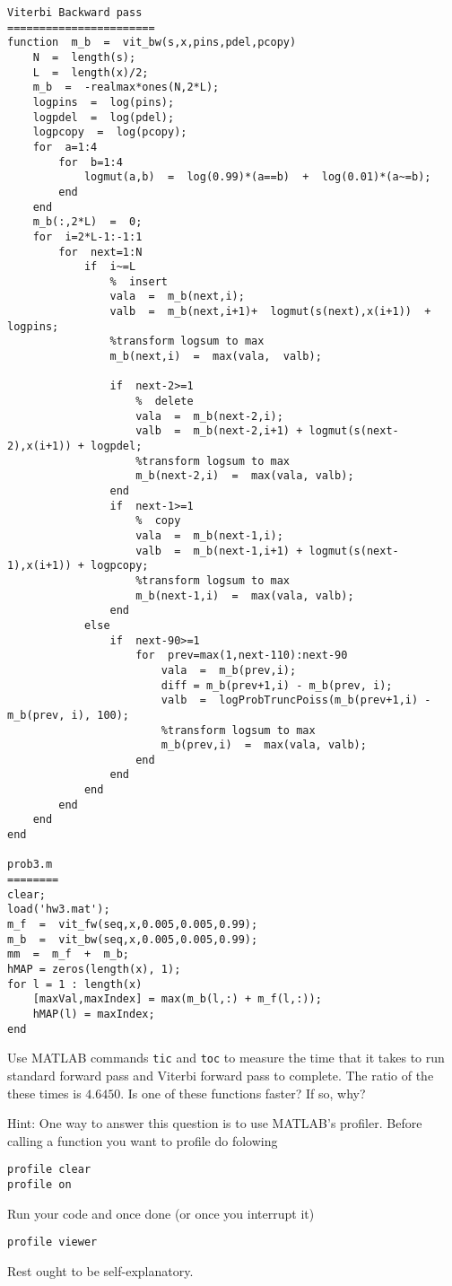 \documentclass{article}
\begin{document}
\begin{verbatim}
Viterbi Backward pass
=======================
function  m_b  =  vit_bw(s,x,pins,pdel,pcopy)
    N  =  length(s);
    L  =  length(x)/2;
    m_b  =  -realmax*ones(N,2*L);
    logpins  =  log(pins);
    logpdel  =  log(pdel);
    logpcopy  =  log(pcopy);
    for  a=1:4
        for  b=1:4
            logmut(a,b)  =  log(0.99)*(a==b)  +  log(0.01)*(a~=b);
        end
    end
    m_b(:,2*L)  =  0;
    for  i=2*L-1:-1:1    
        for  next=1:N
            if  i~=L
                %  insert
                vala  =  m_b(next,i);
                valb  =  m_b(next,i+1)+  logmut(s(next),x(i+1))  +  logpins;
                %transform logsum to max
                m_b(next,i)  =  max(vala,  valb);

                if  next-2>=1
                    %  delete
                    vala  =  m_b(next-2,i);
                    valb  =  m_b(next-2,i+1) + logmut(s(next-2),x(i+1)) + logpdel;
                    %transform logsum to max
                    m_b(next-2,i)  =  max(vala, valb);
                end
                if  next-1>=1
                    %  copy
                    vala  =  m_b(next-1,i);
                    valb  =  m_b(next-1,i+1) + logmut(s(next-1),x(i+1)) + logpcopy;
                    %transform logsum to max
                    m_b(next-1,i)  =  max(vala, valb);
                end
            else
                if  next-90>=1
                    for  prev=max(1,next-110):next-90
                        vala  =  m_b(prev,i);
                        diff = m_b(prev+1,i) - m_b(prev, i);
                        valb  =  logProbTruncPoiss(m_b(prev+1,i) - m_b(prev, i), 100);
                        %transform logsum to max
                        m_b(prev,i)  =  max(vala, valb);
                    end
                end
            end
        end
    end
end

prob3.m
========
clear;
load('hw3.mat');
m_f  =  vit_fw(seq,x,0.005,0.005,0.99);
m_b  =  vit_bw(seq,x,0.005,0.005,0.99);
mm  =  m_f  +  m_b;
hMAP = zeros(length(x), 1);
for l = 1 : length(x)  
    [maxVal,maxIndex] = max(m_b(l,:) + m_f(l,:));
    hMAP(l) = maxIndex;
end
\end{verbatim}

\newproblem{2pt} Use MATLAB commands {\tt tic} and {\tt toc} to measure the time that it takes to run standard forward pass and Viterbi forward pass to complete. The ratio of the these times is $4.6450$. Is one of these functions faster? If so, why?

Hint: One way to answer this question is to use MATLAB's profiler. Before calling a function you want to profile do folowing
\begin{verbatim}
profile clear
profile on
\end{verbatim}
Run your code and once done (or once you interrupt it)
\begin{verbatim}
profile viewer
\end{verbatim}
Rest ought to be self-explanatory.
\end{document}
